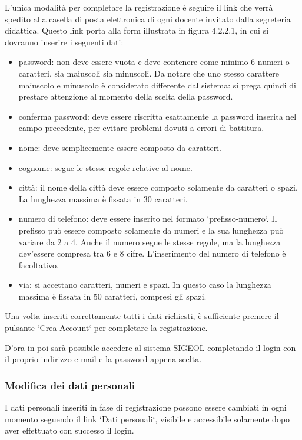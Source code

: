 \documentclass[11pt,a4paper]{article}
\begin{document}
L'unica modalità per completare la registrazione è seguire il link che verrà spedito alla casella di posta elettronica di ogni docente invitato dalla segreteria didattica. Questo link porta alla form illustrata in figura 4.2.2.1, in cui si dovranno inserire i seguenti dati:
\begin{itemize}
 \item password: non deve essere vuota e deve contenere come minimo 6 numeri o caratteri, sia maiuscoli sia minuscoli. Da notare che uno stesso carattere maiuscolo e minuscolo è considerato differente dal sistema: si prega quindi di prestare attenzione al momento della scelta della password.
 \item conferma password: deve essere riscritta esattamente la password inserita nel campo precedente, per evitare problemi dovuti a errori di battitura.
 \item nome: deve semplicemente essere composto da caratteri.
 \item cognome: segue le stesse regole relative al nome.
 \item città: il nome della città deve essere composto solamente da caratteri o spazi. La lunghezza massima è fissata in 30 caratteri.
 \item numero di telefono: deve essere inserito nel formato `prefisso-numero`. Il prefisso può essere composto solamente da numeri e la sua lunghezza può variare da 2 a 4. Anche il numero segue le stesse regole, ma la lunghezza dev'essere compresa tra 6 e 8 cifre. L'inserimento del numero di telefono è facoltativo.
 \item via: si accettano caratteri, numeri e spazi. In questo caso la lunghezza massima è fissata in 50 caratteri, compresi gli spazi.
\end{itemize}
Una volta inseriti correttamente tutti i dati richiesti, è sufficiente premere il pulsante `Crea Account` per completare la registrazione.

D'ora in poi sarà possibile accedere al sistema SIGEOL completando il login con il proprio indirizzo e-mail e la password appena scelta.
\subsubsection{Modifica dei dati personali}
I dati personali inseriti in fase di registrazione possono essere cambiati in ogni momento seguendo il link `Dati personali`, visibile e accessibile solamente dopo aver effettuato con successo il login.
\end{document}
